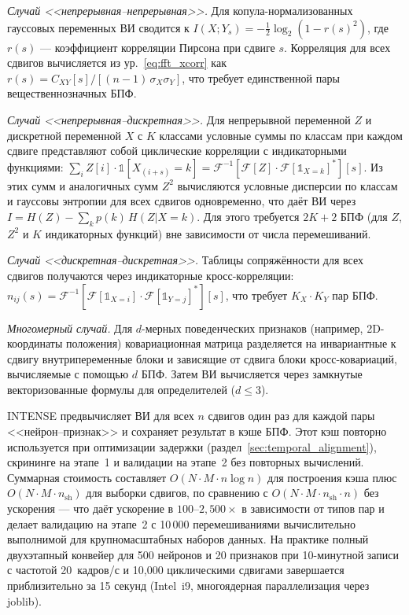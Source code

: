 \textit{Случай <<непрерывная--непрерывная>>.}
Для копула-нормализованных гауссовых переменных ВИ сводится к
$I(X; Y_s) = -\tfrac{1}{2}\log_2(1 - r(s)^2)$, где $r(s)$ --- коэффициент корреляции Пирсона при сдвиге $s$. Корреляция для всех сдвигов вычисляется из
ур.~\ref{eq:fft_xcorr} как $r(s) = C_{XY}[s] / [(n-1)\,\sigma_X \sigma_Y]$,
что требует единственной пары вещественнозначных БПФ.

\textit{Случай <<непрерывная--дискретная>>.}
Для непрерывной переменной $Z$ и дискретной переменной $X$ с $K$ классами
условные суммы по классам при каждом сдвиге представляют собой циклические корреляции с индикаторными функциями:
$\sum_i Z[i] \cdot \mathbb{1}[X_{(i+s)} = k] = \mathcal{F}^{-1}[\mathcal{F}[Z]
\cdot \mathcal{F}[\mathbb{1}_{X=k}]^{*}][s]$.
Из этих сумм и аналогичных сумм $Z^2$ вычисляются условные дисперсии по классам и гауссовы энтропии для всех сдвигов одновременно, что даёт ВИ через
$I = H(Z) - \sum_k p(k)\,H(Z | X\!=\!k)$. Для этого требуется $2K+2$ БПФ
(для $Z$, $Z^2$ и $K$ индикаторных функций) вне зависимости от числа перемешиваний.

\textit{Случай <<дискретная--дискретная>>.}
Таблицы сопряжённости для всех сдвигов получаются через индикаторные кросс-корреляции:
$n_{ij}(s) = \mathcal{F}^{-1}[\mathcal{F}[\mathbb{1}_{X=i}] \cdot
\mathcal{F}[\mathbb{1}_{Y=j}]^{*}][s]$, что требует $K_X \cdot K_Y$ пар БПФ.

\textit{Многомерный случай.}
Для $d$-мерных поведенческих признаков (например, 2D-координаты положения) ковариационная матрица разделяется на инвариантные к сдвигу внутрипеременные блоки и зависящие от сдвига блоки кросс-ковариаций, вычисляемые с помощью $d$ БПФ. Затем ВИ вычисляется через замкнутые векторизованные формулы для определителей ($d \leq 3$).

INTENSE предвычисляет ВИ для всех $n$ сдвигов один раз для каждой пары <<нейрон--признак>> и сохраняет результат в кэше БПФ. Этот кэш повторно используется при оптимизации задержки
(раздел~\ref{sec:temporal_alignment}), скрининге на этапе~1 и
валидации на этапе~2 без повторных вычислений. Суммарная стоимость составляет $O(N \cdot M \cdot n \log n)$
для построения кэша плюс $O(N \cdot M \cdot n_{\text{sh}})$ для выборки сдвигов,
по сравнению с $O(N \cdot M \cdot n_{\text{sh}} \cdot n)$ без ускорения ---
что даёт ускорение в $100$--$2{,}500\times$ в зависимости от типов пар и делает
валидацию на этапе~2 с 10\,000 перемешиваниями вычислительно выполнимой для крупномасштабных
наборов данных. На практике полный двухэтапный конвейер для 500 нейронов и 20 признаков
при 10-минутной записи с частотой 20~кадров/с и 10{,}000 циклическими сдвигами завершается приблизительно за 15 секунд (Intel~i9, многоядерная параллелизация через joblib).

